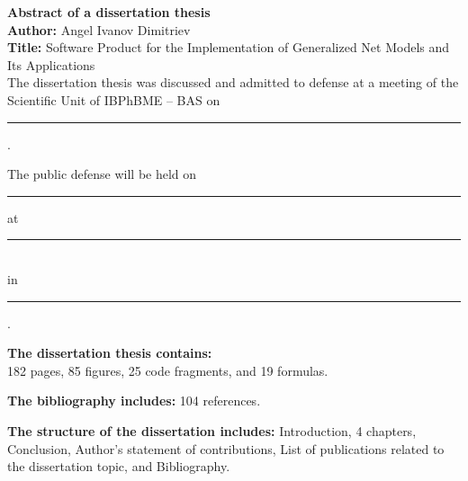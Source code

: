 \newpage
\thispagestyle{empty}

\begin{flushleft}
	
	{\large \textbf{Abstract of a dissertation thesis}}\\[0.5cm]
	
	\textbf{Author:} Angel Ivanov Dimitriev\\[0.3cm]
	\textbf{Title:} Software Product for the Implementation of Generalized Net Models and Its Applications\\[0.5cm]
	
	The dissertation thesis was discussed and admitted to defense at a meeting of the Scientific Unit of IBPhBME -- BAS on \rule{5cm}{0.4pt}.
	
	\vspace{0.5cm}
	
	The public defense will be held on \rule{5cm}{0.4pt} at \rule{3cm}{0.4pt} \\
	in \rule{8cm}{0.4pt}.
	
	\vspace{1cm}
	
	
	\vspace{1cm}
	
	\textbf{The dissertation thesis contains:} \\
	182 pages, 85 figures, 25 code fragments, and 19 formulas.
	
	\vspace{0.3cm}
	
	\textbf{The bibliography includes:} 104 references.
	
	\vspace{0.3cm}
	
	\textbf{The structure of the dissertation includes:} Introduction, 4 chapters, Conclusion, Author's statement of contributions, List of publications related to the dissertation topic, and Bibliography.
	

\end{flushleft}
